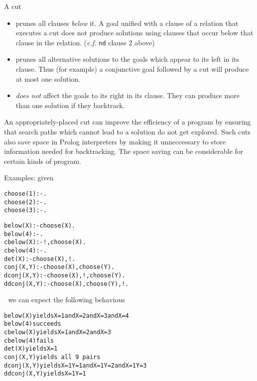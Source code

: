 \documentclass{popl}
\newenvironment{smalltt}{\begin{alltt}\smaller}{\end{alltt}}
\newcommand{\rmbox}[1]{\mbox{{\rm #1}}}
\begin{document}
\begin{foil} 

A cut
\begin{itemize}
\item prunes all clauses {\it below} it. A goal unified with a clause of a relation that 
executes a cut does not produce solutions using clauses that occur below 
that clause in the relation. ({\it c.f.} {\tt nd} clause 2 above)

\item prunes all alternative solutions to the
goals which appear to its left in its clause. Thus (for example)
a conjunctive goal followed by a cut will produce at most
one solution.

\item {\it does not} affect the goals to its right in its clause. They can produce more than
one solution if they backtrack. 
\end{itemize}
\begin{note}
An appropriately-placed cut can improve the efficiency of a program by ensuring that
search paths which cannot lead to a solution do not get explored. Such cuts
also save space in Prolog interpreters by making it unneccessary to store
information needed for backtracking. The space saving can be
considerable for certain kinds of program.
\end{note}
\end{foil}

\begin{foil} 
Examples: given
\begin{smalltt}
        choose(1) :-.
        choose(2) :-.
        choose(3) :-. 
        
        below(X)     :- choose(X).
        below(4)     :- .
        cbelow(X)    :- !, choose(X).
        cbelow(4)    :- .
        det(X)       :- choose(X), !.
        conj(X, Y)   :- choose(X), choose(Y).
        dconj(X, Y)  :- choose(X), !, choose(Y).
        ddconj(X, Y) :- choose(X), choose(Y), !.
        
\end{smalltt}

we can expect the following behavious
\begin{smalltt}
        below(X)     \rmbox{yields} X = 1 and X = 2 and X = 3 and X = 4
        below(4)     \rmbox{succeeds}
        cbelow(X)    \rmbox{yields} X = 1 and X = 2 and X = 3
        cbelow(4)    \rmbox{fails}
        det(X)       \rmbox{yields} X = 1
        conj(X, Y)   \rmbox{yields all 9 pairs}
        dconj(X, Y)  \rmbox{yields} X=1 Y=1 and X=1 Y=2 and X=1 Y=3
        ddconj(X, Y) \rmbox{yields} X=1 Y=1 
\end{smalltt}

\end{foil}
\end{document}
